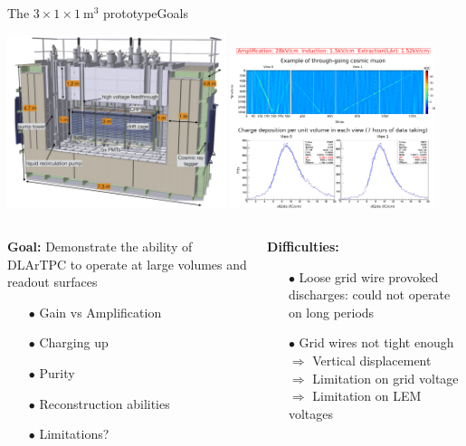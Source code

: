 \documentclass[10pt]{beamer}
\begin{document}
    \begin{frame}{The \texorpdfstring{$3 \times 1 \times \SI{1}{\meter\cubed}$}{311} prototype}{Goals}
    	\begin{scriptsize}
    		\includegraphics[width=0.48\textwidth]{figures/311/311_2.png}\hfill
    		\includegraphics[width=0.45\textwidth]{figures/311/run840.png}\\
    		\vfill
    		\begin{columns}
    			\begin{column}{0.48\textwidth}
    				\textbf{Goal:} Demonstrate the ability of DLArTPC to operate at large volumes and readout surfaces
    				\begin{itemize}
    					\item[$\bullet$] Gain vs Amplification
    					\item[$\bullet$] Charging up
    					\item[$\bullet$] Purity
    					\item[$\bullet$] Reconstruction abilities
    					\item[$\bullet$] Limitations?
    				\end{itemize}
    			\end{column}\hfill
    			\begin{column}{0.48\textwidth}
    				\textbf{Difficulties:} 
    				\begin{itemize}
    					\item[$\bullet$] Loose grid wire provoked discharges: could not operate on long periods
    					\item[$\bullet$] Grid wires not tight enough\\$\Rightarrow$ Vertical displacement\\$\Rightarrow$ Limitation on grid voltage\\$\Rightarrow$ Limitation on LEM voltages

\end{itemize}
\end{column}
\end{columns}
\end{scriptsize}
\end{frame}
\end{document}
